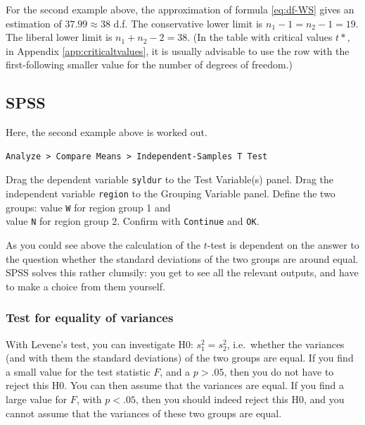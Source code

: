 \documentclass[
]{book}
\begin{document}
For the second example above, the approximation of formula
\eqref{eq:df-WS} gives
an estimation of \(37.99 \approx 38\) d.f. The conservative lower limit is
\(n_1-1 = n_2-1 = 19\). The liberal lower limit is \(n_1+n_2 -2 = 38\). (In
the table with critical values \(t*\), in
Appendix \ref{app:criticaltvalues}, it is usually advisable to use the row
with the first-following smaller value for the number of
degrees of freedom.)

\hypertarget{sec:SPSS-ttest-unpaired}{%
\subsection{SPSS}\label{sec:SPSS-ttest-unpaired}}

Here, the second example above is worked out.

\begin{verbatim}
Analyze > Compare Means > Independent-Samples T Test
\end{verbatim}

Drag the dependent variable \texttt{syldur} to the Test Variable(s) panel.
Drag the independent variable \texttt{region} to the Grouping
Variable panel. Define the two groups: value \texttt{W} for region group 1 and\\
value \texttt{N} for region group 2. Confirm with \texttt{Continue} and \texttt{OK}.

As you could see above the calculation of the \(t\)-test is dependent on the
answer to the question whether the standard deviations of the two groups
are around equal. SPSS solves this rather clumsily: you get to see all the
relevant outputs, and have to make a choice from them yourself.

\hypertarget{test-for-equality-of-variances}{%
\subsubsection{Test for equality of variances}\label{test-for-equality-of-variances}}

With Levene's test, you can investigate H0: \(s^2_1 = s^2_2\), i.e.~whether
the variances (and with them the standard deviations) of the two groups
are equal. If you find a small value for the test statistic \(F\),
and a \(p>.05\), then you do not have to reject this H0. You can then assume
that the variances are equal. If you find a large value for \(F\),
with \(p<.05\), then you should indeed reject this H0, and you cannot
assume that the variances of these two groups are equal.
\end{document}
